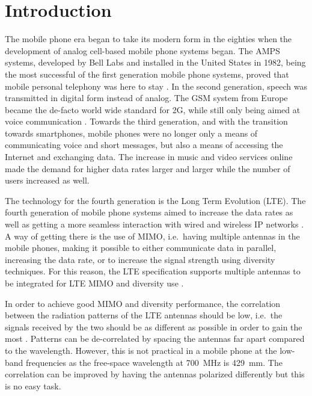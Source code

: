 \chapter*{Introduction}
\label{cha:intro}

The mobile phone era began to take its modern form in the eighties when the development of analog cell-based mobile phone systems began. The AMPS systems, developed by Bell Labs and installed in the United States in 1982, being the most successful of the first generation mobile phone systems, proved that mobile personal telephony was here to stay \cite{tanenbaum2012computer}. In the second generation, speech was transmitted in digital form instead of analog. The GSM system from Europe became the de-facto world wide standard for 2G, while still only being aimed at voice communication \cite{tanenbaum2012computer}. Towards the third generation, and with the transition towards smartphones, mobile phones were no longer only a means of communicating voice and short messages, but also a means of accessing the Internet and exchanging data. The increase in music and video services online made the demand for higher data rates larger and larger while the number of users increased as well.

The technology for the fourth generation is the Long Term Evolution (LTE). The fourth generation of mobile phone systems aimed to increase the data rates as well as getting a more seamless interaction with wired and wireless IP networks \cite{tanenbaum2012computer}. A way of getting there is the use of MIMO, i.e.\ having multiple antennas in the mobile phones, making it possible to either communicate data in parallel, increasing the data rate, or to increase the signal strength using diversity techniques. For this reason, the LTE specification supports multiple antennas to be integrated for LTE MIMO and diversity use \cite{holma2011lte}.

In order to achieve good MIMO and diversity performance, the correlation between the radiation patterns of the LTE antennas should be low, i.e.\ the signals received by the two should be as different as possible in order to gain the most \cite{Tim2012Practical}. Patterns can be de-correlated by spacing the antennas far apart compared to the wavelength. However, this is not practical in a mobile phone at the low-band frequencies as the free-space wavelength at \SI{700}{MHz} is \SI{429}{mm}. The correlation can be improved by having the antennas polarized differently but this is no easy task.

